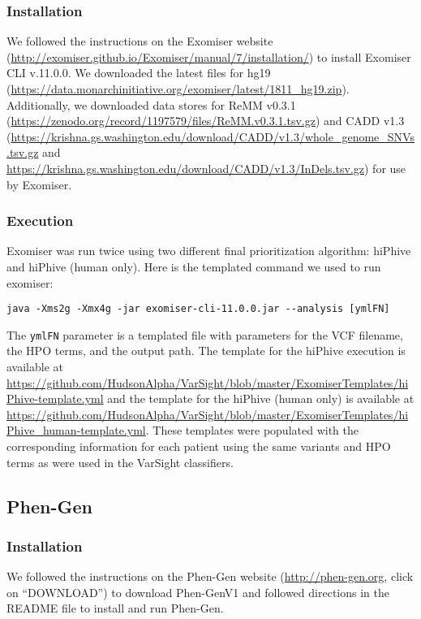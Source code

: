\documentclass{article}
\begin{document}
\subsubsection{Installation}
We followed the instructions on the Exomiser website (\url{http://exomiser.github.io/Exomiser/manual/7/installation/}) to install Exomiser CLI v.11.0.0.  We downloaded the latest files for hg19 (\url{https://data.monarchinitiative.org/exomiser/latest/1811_hg19.zip}).  Additionally, we downloaded data stores for ReMM v0.3.1 (\url{https://zenodo.org/record/1197579/files/ReMM.v0.3.1.tsv.gz}) and CADD v1.3 (\url{https://krishna.gs.washington.edu/download/CADD/v1.3/whole_genome_SNVs.tsv.gz} and \url{https://krishna.gs.washington.edu/download/CADD/v1.3/InDels.tsv.gz}) for use by Exomiser. 

\subsubsection{Execution}
Exomiser was run twice using two different final prioritization algorithm: hiPhive and hiPhive (human only).  Here is the templated command we used to run exomiser:
\begin{verbatim}
java -Xms2g -Xmx4g -jar exomiser-cli-11.0.0.jar --analysis [ymlFN]
\end{verbatim}

The \texttt{ymlFN} parameter is a templated file with parameters for the VCF filename, the HPO terms, and the output path.  The template for the hiPhive execution is available at \url{https://github.com/HudsonAlpha/VarSight/blob/master/ExomiserTemplates/hiPhive-template.yml} and the template for the hiPhive (human only) is available at \url{https://github.com/HudsonAlpha/VarSight/blob/master/ExomiserTemplates/hiPhive_human-template.yml}.  These templates were populated with the corresponding information for each patient using the same variants and HPO terms as were used in the VarSight classifiers.

\subsection{Phen-Gen}
\subsubsection{Installation}
We followed the instructions on the Phen-Gen website (\url{http://phen-gen.org}, click on ``DOWNLOAD'') to download Phen-GenV1 and followed directions in the README file to install and run Phen-Gen.  
\end{document}
